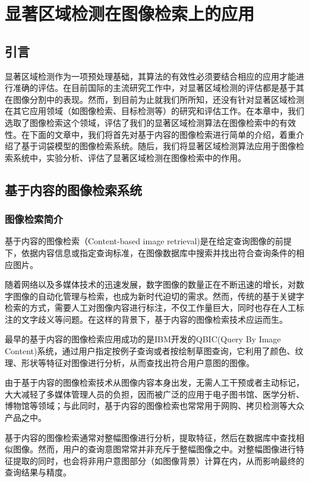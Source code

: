 \chapter{显著区域检测在图像检索上的应用}

\section{引言}
显著区域检测作为一项预处理基础，其算法的有效性必须要结合相应的应用才能进行准确的评估。在目前国际的主流研究工作中，对显著区域检测的评估都是基于其在图像分割中的表现。然而，到目前为止就我们所所知，还没有针对显著区域检测在其它应用领域（如图像检索、目标检测等）的研究和评估工作。在本章中，我们选取了图像检索这个领域，评估了我们的显著区域检测算法在图像检索中的有效性。在下面的文章中，我们将首先对基于内容的图像检索进行简单的介绍，着重介绍了基于词袋模型的图像检索系统。随后，我们将显著区域检测算法应用于图像检索系统中，实验分析、评估了显著区域检测在图像检索中的作用。

\section{基于内容的图像检索系统}

\subsection{图像检索简介}
基于内容的图像检索（Content-based image retrieval)是在给定查询图像的前提下，依据内容信息或指定查询标准，在图像数据库中搜索并找出符合查询条件的相应图片\cite{cyy2007img}。

随着网络以及多媒体技术的迅速发展，数字图像的数量正在不断迅速的增长，对数字图像的自动化管理与检索，也成为新时代迫切的需求。然而，传统的基于关键字检索的方式，需要人工对图像内容进行标注，不仅工作量巨大，同时也存在人工标注的文字歧义等问题。在这样的背景下，基于内容的图像检索技术应运而生。

最早的基于内容的图像检索应用成功的是IBM开发的QBIC\cite{qbic}(Query By Image Content)系统，通过用户指定按例子查询或者按绘制草图查询，它利用了颜色、纹理、形状等特征对图像进行分析，从而查找出符合用户意图的图像。

由于基于内容的图像检索技术从图像内容本身出发，无需人工干预或者主动标记，大大减轻了多媒体管理人员的负担，因而被广泛的应用于电子图书馆、医学分析、博物馆等领域；与此同时，基于内容的图像检索也常常用于网购、拷贝检测等大众产品之中。

基于内容的图像检索通常对整幅图像进行分析，提取特征，然后在数据库中查找相似图像。然而，用户的查询意图常常并非充斥于整幅图像之中。对整幅图像进行特征提取的同时，也会将非用户意图部分（如图像背景）计算在内，从而影响最终的查询结果与精度。

